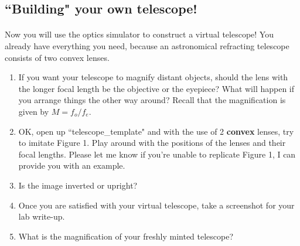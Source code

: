 \documentclass[12pt]{article}%
\begin{document}
\subsection*{``Building" your own telescope!}
 
\paragraph{}
Now you will use the optics simulator to construct a virtual telescope! You already have everything you need, because an astronomical refracting telescope consists of two convex lenses.
\begin{enumerate}
           \item If you want your telescope to magnify distant objects, should the lens with the longer focal length be the objective or the eyepiece? What will happen if you arrange things the other way around? Recall that the magnification is given by $M = f_o/f_e$.
           \item OK, open up ``telescope\_template" and with the use of 2 \textbf{convex} lenses, try to imitate Figure 1. Play around with the positions of the lenses and their focal lengths. Please let me know if you're unable to replicate Figure 1, I can provide you with an example.
           \item Is the image inverted or upright?
           \item Once you are satisfied with your virtual telescope, take a screenshot for your lab write-up.
           \item What is the magnification of your freshly minted telescope?
\end{enumerate}
 
 
\end{document}
